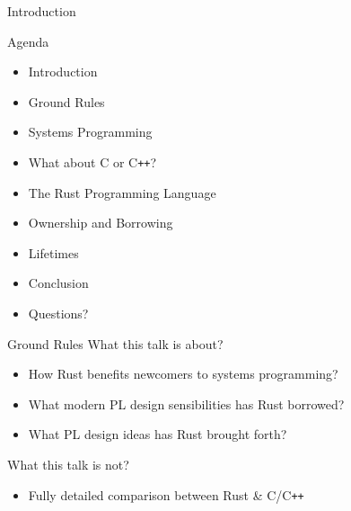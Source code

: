 \begin{section}{Introduction}
  \begin{frame}{Agenda}
    \begin{itemize}
    \item Introduction
    \item Ground Rules
    \item Systems Programming
    \item What about C or C\texttt{++}?
    \item The Rust Programming Language
    \item Ownership and Borrowing
    \item Lifetimes
    \item Conclusion
    \item Questions?
    \end{itemize}
  \end{frame}

  \begin{frame}{Ground Rules}
    What this talk is about?
    \begin{itemize}
    \item How Rust benefits newcomers to systems programming?
    \item What modern PL design sensibilities has Rust borrowed?
    \item What PL design ideas has Rust brought forth?
    \end{itemize}

    What this talk is not?
    \begin{itemize}
    \item Fully detailed comparison between Rust \& C/C\texttt{++}
    \end{itemize}
  \end{frame}
\end{section}
